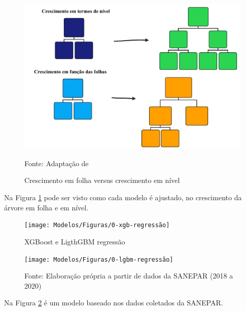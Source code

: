 \begin{figure}[H]
	\centering
	\caption{Crescimento em folha versus crescimento em nível}
	\label{fig:xgboost}
	\includegraphics[width=0.7\linewidth]{Modelos/Figuras/xgboost}
	
	Fonte: Adaptação de 
\end{figure}


Na Figura \ref{fig:xgboost} pode ser visto como cada modelo é ajustado, no crescimento da árvore em folha e em nível.

\begin{figure}[H]
	\centering
	\caption{XGBoost e LigthGBM regressão}\label{fig:1-xgb-regressao}
	\texttt{[image: Modelos/Figuras/0-xgb-regressão]}
	
\end{figure}

\begin{figure}[H]
	\centering
	\texttt{[image: Modelos/Figuras/0-lgbm-regressão]}	
	
	
	Fonte: Elaboração própria a partir de dados da SANEPAR (2018 a 2020)
	
\end{figure}

Na Figura \ref{fig:1-xgb-regressao} é um modelo baseado nos dados coletados da SANEPAR.

